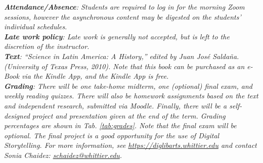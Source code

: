 \documentclass[10pt]{article}
\begin{document}
\textit{\textbf{Attendance/Absence}: Students are required to log in for the morning Zoom sessions, however the asynchronous content may be digested on the students' individual schedules}.\\ 
\textit{\textbf{Late work policy}: Late work is generally not accepted, but is left to the discretion of the instructor.} \\
\textit{\textbf{Text}: ``Science in Latin America: A History,'' edited by Juan Jos\'{e} Salda\~{n}a.  (University of Texas Press, 2010).  Note that this book can be purchased as an e-Book via the Kindle App, and the Kindle App is free.} \\
\textit{\textbf{Grading}: There will be one take-home midterm, one (optional) final exam, and weekly reading quizzes.  There will also be homework assignments based on the text and independent research, submitted via Moodle.  Finally, there will be a self-designed project and presentation given at the end of the term.  Grading percentages are shown in Tab. \ref{tab:grades}.  Note that the final exam will be optional. The final project is a good opportunity for the use of Digital Storytelling.  For more information, see \url{https://diglibarts.whittier.edu} and contact Sonia Chaidez: \url{schaidez@whittier.edu}. } \\
\end{document}
